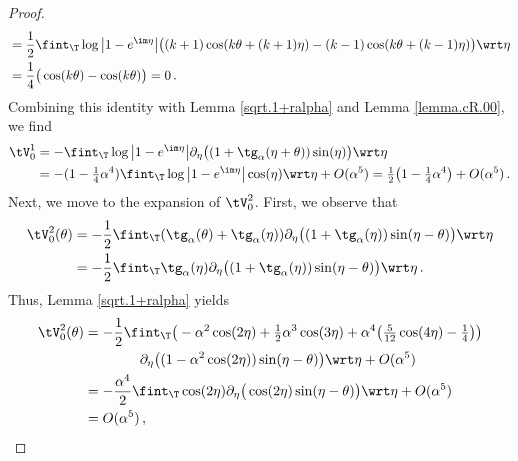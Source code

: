 \documentclass[a4paper,reqno,10pt]{article}
\newcommand{\pa}{\partial}
\begin{document}
\begin{proof}
\begin{align}
	 		& = \frac{1}{2 }\fint_{\T} \log\big| 1- e^{\im\eta} \big|   \big( (k+1)\cos(k\theta+(k+1)\eta) - (k-1)\cos(k\theta+(k-1)\eta) \big) \wrt\eta \\
	 		& = \frac{1}{4} \big( \cos(k\theta)-\cos(k\theta) \big) = 0\,.
	 	\end{align}
	 Combining this identity with  Lemma \ref{sqrt.1+ralpha} and Lemma \ref{lemma.cR.00}, we find
	 	\begin{align}
	 		\tV_{0}^{1} &= - \fint_{\T} \log\big| 1- e^{\im\eta} \big| \pa_{\eta} \big( (1+\tg_{\alpha}(\eta+\theta)) \sin(\eta) \big) \wrt\eta \\
	 		&= -  (1-\tfrac14 \alpha^4)\fint_{\T} \log\big| 1- e^{\im\eta} \big|  \cos(\eta)  \wrt\eta +O(\alpha^5) = \tfrac12 \big(1- \tfrac14 \alpha^4\big) + O(\alpha^5) \,.
	 	\end{align}
	 Next, we move to the expansion of $\tV_{0}^{2}$. First, we observe that
    \begin{align}
	 	\tV_{0}^{2}(\theta)	&= - \frac{1}{2}  \fint_{\T} (\tg_{\alpha}(\theta)+\tg_{\alpha}(\eta)) \pa_{\eta} \big( (1+\tg_{\alpha}(\eta)) \sin(\eta-\theta) \big) \wrt\eta \\
	 		& = - \frac{1}{2} \fint_{\T} \tg_{\alpha}(\eta) \pa_{\eta} \big( (1+\tg_{\alpha}(\eta)) \sin(\eta-\theta) \big) \wrt\eta  \,.
	 	\end{align}     
     Thus,   Lemma \ref{sqrt.1+ralpha} yields
	 	\begin{align}
	 	\tV_{0}^{2}(\theta)	
	 		& = - \frac{1}{2} \fint_{\T} \big(- \alpha^2 \cos(2\eta) +\tfrac12 \alpha^3 \cos(3\eta) + \alpha^4\big( \tfrac{5}{12} \cos(4\eta) -\tfrac14 \big) \big) \\ & \quad \quad \quad \quad\pa_{\eta} \big( (1-\alpha^2 \cos(2\eta)) \sin(\eta-\theta) \big) \wrt\eta + O(\alpha^5) \\
	 		& = - \frac{\alpha^4}{2} \fint_{\T}\cos(2\eta) \pa_{\eta} \big( \cos(2\eta) \sin(\eta-\theta) \big) \wrt\eta + O(\alpha^5) \\
            & = O(\alpha^5) \,,

\end{align}
\end{proof}
\end{document}
